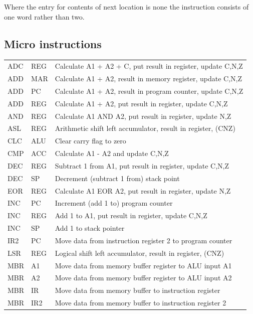 \documentclass{article}
\begin{document}
Where the entry for contents of next location is none the instruction consists of one word rather than two.

\newpage

\subsection{Micro instructions}

\small
\begin{tabular}{ m{1cm} m{1cm} m{11cm} }
    ADC & REG & Calculate A1 + A2 + C, put result in register, update C,N,Z \\
    ADD & MAR & Calculate A1 + A2, result in memory register, update C,N,Z \\
    ADD & PC  & Calculate A1 + A2, result in program counter, update C,N,Z \\
    ADD & REG & Calculate A1 + A2, put result in register, update C,N,Z \\
    AND & REG & Calculate A1 AND A2, put result in register, update N,Z \\
    ASL & REG & Arithmetic shift left accumulator, result in register, (CNZ) \\
    CLC & ALU & Clear carry flag to zero \\
    CMP & ACC & Calculate A1 - A2 and update C,N,Z \\
    DEC & REG & Subtract 1 from A1, put result in register, update C,N,Z \\
    DEC & SP  & Decrement (subtract 1 from) stack point \\
    EOR & REG & Calculate A1 EOR A2, put result in register, update N,Z \\
    INC & PC  & Increment (add 1 to) program counter \\
    INC & REG & Add 1 to A1, put result in register, update C,N,Z \\
    INC & SP  & Add 1 to stack pointer \\
    IR2 & PC  & Move data from instruction register 2 to program counter \\
    LSR & REG & Logical shift left accumulator, result in register, (CNZ) \\
    MBR & A1  & Move data from memory buffer register to ALU input A1 \\
    MBR & A2  & Move data from memory buffer register to ALU input A2 \\
    MBR & IR  & Move data from memory buffer to instruction register \\
    MBR & IR2 & Move data from memory buffer to instruction register 2 \\

\end{tabular}
\end{document}
